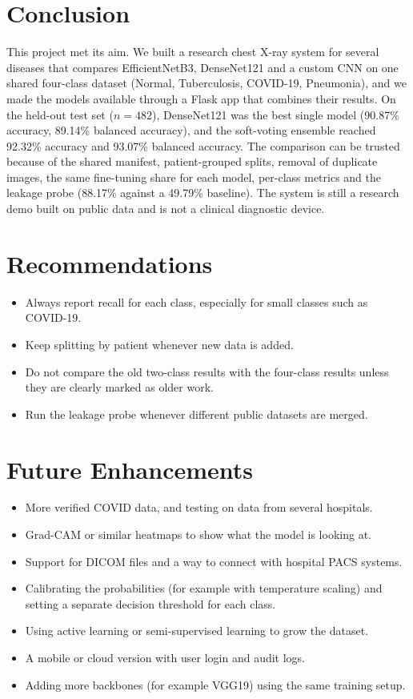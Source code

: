 
\section{Conclusion}

This project met its aim. We built a research chest X-ray system for several diseases that compares EfficientNetB3, DenseNet121 and a custom CNN on one shared four-class dataset (Normal, Tuberculosis, COVID-19, Pneumonia), and we made the models available through a Flask app that combines their results. On the held-out test set ($n=482$), DenseNet121 was the best single model (90.87\% accuracy, 89.14\% balanced accuracy), and the soft-voting ensemble reached 92.32\% accuracy and 93.07\% balanced accuracy. The comparison can be trusted because of the shared manifest, patient-grouped splits, removal of duplicate images, the same fine-tuning share for each model, per-class metrics and the leakage probe (88.17\% against a 49.79\% baseline). The system is still a research demo built on public data and is not a clinical diagnostic device.

\section{Recommendations}

\begin{itemize}
    \item Always report recall for each class, especially for small classes such as COVID-19.
    \item Keep splitting by patient whenever new data is added.
    \item Do not compare the old two-class results with the four-class results unless they are clearly marked as older work.
    \item Run the leakage probe whenever different public datasets are merged.
\end{itemize}

\section{Future Enhancements}

\begin{itemize}
    \item More verified COVID data, and testing on data from several hospitals.
    \item Grad-CAM or similar heatmaps to show what the model is looking at.
    \item Support for DICOM files and a way to connect with hospital PACS systems.
    \item Calibrating the probabilities (for example with temperature scaling) and setting a separate decision threshold for each class.
    \item Using active learning or semi-supervised learning to grow the dataset.
    \item A mobile or cloud version with user login and audit logs.
    \item Adding more backbones (for example VGG19) using the same training setup.
\end{itemize}

